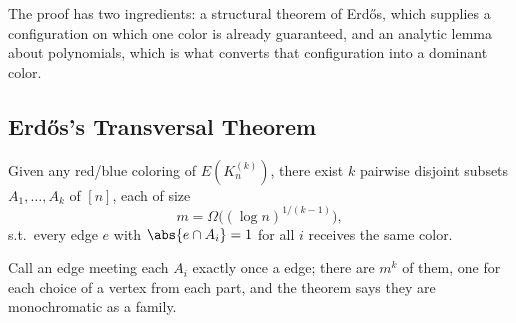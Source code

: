 The proof has two ingredients: a structural theorem of Erd\H{o}s, which supplies a configuration on which one color is already guaranteed, and an analytic lemma about polynomials, which is what converts that configuration into a dominant color.

\subsection{Erd\H{o}s's Transversal Theorem}

\begin{theorem}[Erd\H{o}s]\label{thm:erdos-transversal}
    Given any red/blue coloring of \(E(K_n^{(k)})\), there exist \(k\) pairwise disjoint subsets \(A_1, \ldots, A_k\) of \([n]\), each of size
    \[
        m = \Omega\bigl( (\log n)^{1/(k-1)} \bigr),
    \]
    s.t.\ every edge \(e\) with \(\abs{e \cap A_i} = 1\) for all \(i\) receives the same color.
\end{theorem}

Call an edge meeting each \(A_i\) exactly once a  edge; there are \(m^k\) of them, one for each choice of a vertex from each part, and the theorem says they are monochromatic as a family.
\begin{center}
\end{center}

